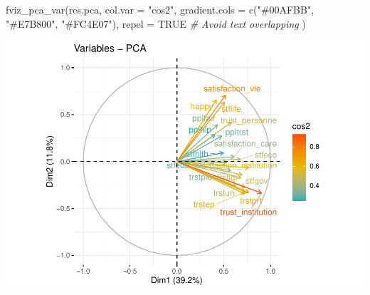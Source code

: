 \documentclass[
]{book}
\newenvironment{Shaded}{\begin{snugshade}}{\end{snugshade}}
\newcommand{\AttributeTok}[1]{\textcolor[rgb]{0.77,0.63,0.00}{#1}}
\newcommand{\CommentTok}[1]{\textcolor[rgb]{0.56,0.35,0.01}{\textit{#1}}}
\newcommand{\ConstantTok}[1]{\textcolor[rgb]{0.00,0.00,0.00}{#1}}
\newcommand{\FunctionTok}[1]{\textcolor[rgb]{0.00,0.00,0.00}{#1}}
\newcommand{\NormalTok}[1]{#1}
\newcommand{\StringTok}[1]{\textcolor[rgb]{0.31,0.60,0.02}{#1}}
\begin{document}
\begin{Shaded}
\begin{Highlighting}[]
\FunctionTok{fviz\_pca\_var}\NormalTok{(res.pca, }\AttributeTok{col.var =} \StringTok{"cos2"}\NormalTok{,}
             \AttributeTok{gradient.cols =} \FunctionTok{c}\NormalTok{(}\StringTok{"\#00AFBB"}\NormalTok{, }\StringTok{"\#E7B800"}\NormalTok{, }\StringTok{"\#FC4E07"}\NormalTok{), }
             \AttributeTok{repel =} \ConstantTok{TRUE} \CommentTok{\# Avoid text overlapping}
\NormalTok{             )}
\end{Highlighting}
\end{Shaded}

\includegraphics{bookdown-demo_files/figure-latex/1103-4.pdf}
\end{document}
